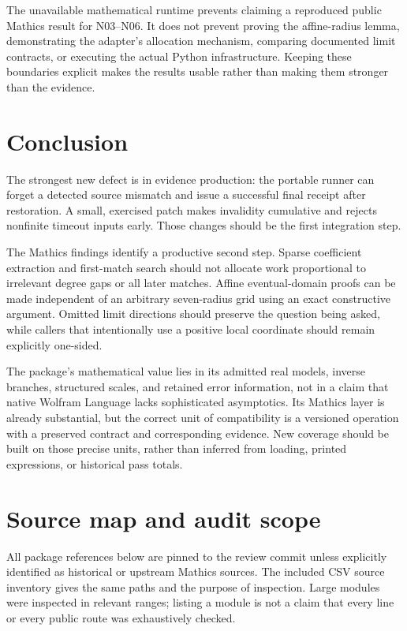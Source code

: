 \documentclass[11pt,a4paper]{article}
\begin{document}
The unavailable mathematical runtime prevents claiming a reproduced public
Mathics result for N03--N06. It does not prevent proving the affine-radius
lemma, demonstrating the adapter's allocation mechanism, comparing documented
limit contracts, or executing the actual Python infrastructure. Keeping these
boundaries explicit makes the results usable rather than making them stronger
than the evidence.

\section{Conclusion}

The strongest new defect is in evidence production: the portable runner can
forget a detected source mismatch and issue a successful final receipt after
restoration. A small, exercised patch makes invalidity cumulative and rejects
nonfinite timeout inputs early. Those changes should be the first integration
step.

The Mathics findings identify a productive second step. Sparse coefficient
extraction and first-match search should not allocate work proportional to
irrelevant degree gaps or all later matches. Affine eventual-domain proofs can
be made independent of an arbitrary seven-radius grid using an exact
constructive argument. Omitted limit directions should preserve the question
being asked, while callers that intentionally use a positive local coordinate
should remain explicitly one-sided.

The package's mathematical value lies in its admitted real models, inverse
branches, structured scales, and retained error information, not in a claim
that native Wolfram Language lacks sophisticated asymptotics. Its Mathics layer
is already substantial, but the correct unit of compatibility is a versioned
operation with a preserved contract and corresponding evidence. New coverage
should be built on those precise units, rather than inferred from loading,
printed expressions, or historical pass totals.

\appendix
\section{Source map and audit scope}

All package references below are pinned to the review commit unless explicitly
identified as historical or upstream Mathics sources. The included CSV source
inventory gives the same paths and the purpose of inspection. Large modules
were inspected in relevant ranges; listing a module is not a claim that every
line or every public route was exhaustively checked.
\end{document}

